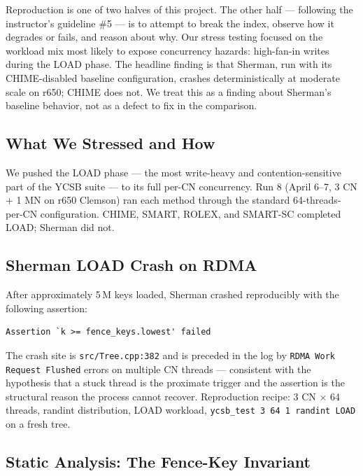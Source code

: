 \documentclass[11pt,a4paper]{article}
\begin{document}
Reproduction is one of two halves of this project. The other half --- following the instructor's guideline \#5 --- is to attempt to break the index, observe how it degrades or fails, and reason about why. Our stress testing focused on the workload mix most likely to expose concurrency hazards: high-fan-in writes during the LOAD phase. The headline finding is that Sherman, run with its CHIME-disabled baseline configuration, crashes deterministically at moderate scale on r650; CHIME does not. We treat this as a finding about Sherman's baseline behavior, not as a defect to fix in the comparison.

\subsection{What We Stressed and How}

We pushed the LOAD phase --- the most write-heavy and contention-sensitive part of the YCSB suite --- to its full per-CN concurrency. Run 8 (April 6--7, 3 CN + 1 MN on r650 Clemson) ran each method through the standard 64-threads-per-CN configuration. CHIME, SMART, ROLEX, and SMART-SC completed LOAD; Sherman did not.

\subsection{Sherman LOAD Crash on RDMA}
\label{sec:stress-sherman-crash}

After approximately 5\,M keys loaded, Sherman crashed reproducibly with the following assertion:

\begin{lstlisting}
Assertion `k >= fence_keys.lowest' failed
\end{lstlisting}

The crash site is \texttt{src/Tree.cpp:382} and is preceded in the log by \texttt{RDMA Work Request Flushed} errors on multiple CN threads --- consistent with the hypothesis that a stuck thread is the proximate trigger and the assertion is the structural reason the process cannot recover. Reproduction recipe: 3 CN $\times$ 64 threads, randint distribution, LOAD workload, \texttt{ycsb\_test 3 64 1 randint LOAD} on a fresh tree.

\subsection{Static Analysis: The Fence-Key Invariant}
\label{sec:stress-static-analysis}
\end{document}

